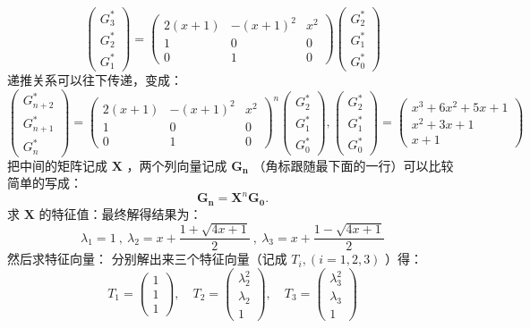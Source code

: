 \documentclass[oneside]{book}
\theoremstyle{definition}
\begin{document}
\[
\begin{pmatrix}
	G_3^* \\
	G_2^* \\
	G_1^*
\end{pmatrix}
=
\begin{pmatrix}
	2(x+1)  & - (x+1)^2 & x^2 \\
	1 & 0 & 0 \\
	0 & 1 & 0
\end{pmatrix}
\begin{pmatrix}
	G_2^* \\
	G_1^* \\
	G_0^*
\end{pmatrix}
\]
递推关系可以往下传递，变成：
\[
\begin{pmatrix}
	G_{n+2}^* \\
	G_{n+1}^* \\
	G_{n}^*
\end{pmatrix}
=
\begin{pmatrix}
	2(x+1)  & - (x+1)^2 & x^2 \\
	1 & 0 & 0 \\
	0 & 1 & 0
\end{pmatrix}^n
\begin{pmatrix}
	G_2^* \\
	G_1^* \\
	G_0^*
\end{pmatrix},\begin{pmatrix}
G_2^* \\
G_1^* \\
G_0^*
\end{pmatrix}=\begin{pmatrix}
x^3+6x^2+5x+1 \\
x^2+3x+1 \\
x+1
\end{pmatrix}
\] 
把中间的矩阵记成 \( \mathbf{X} \) ，两个列向量记成 \( \mathbf{G_n}\) （角标跟随最下面的一行）可以比较简单的写成：
\[\mathbf{G_n}=\mathbf{X}^n\mathbf{G_0}.\]
求 \( \mathbf{X} \) 的特征值：最终解得结果为：
\[\lambda_1=1\ ,\ \lambda_2=x+\frac{1+\sqrt{4x+1}}{2}\ ,\ \lambda_3=x+\frac{1-\sqrt{4x+1}}{2}\]
然后求特征向量：
分别解出来三个特征向量（记成 \( T_i ,(i=1,2,3)\) ）得：
\[
T_1=\begin{pmatrix}
	1 \\
	1 \\
	1
\end{pmatrix},\quad
T_2=\begin{pmatrix}
	\lambda_2^2 \\
	\lambda_2 \\
	1
\end{pmatrix},\quad
T_3=\begin{pmatrix}
\lambda_3^2 \\
\lambda_3 \\
1
\end{pmatrix}\] 
\end{document}
